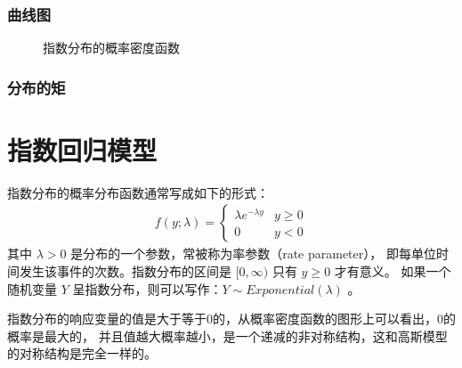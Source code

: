 \documentclass[letterpaper,10pt,english]{sphinxmanual}
\begin{document}
\subsubsection{曲线图}
\label{\detokenize{_u6307_u6570_u6a21_u578b/content:id4}}
\begin{figure}[htbp]
\centering
\capstart

\noindent{}
\caption{指数分布的概率密度函数}\label{\detokenize{_u6307_u6570_u6a21_u578b/content:id10}}\label{\detokenize{_u6307_u6570_u6a21_u578b/content:exponential-distribution-pdf}}\end{figure}


\subsubsection{分布的矩}
\label{\detokenize{_u6307_u6570_u6a21_u578b/content:id5}}

\section{指数回归模型}
\label{\detokenize{_u6307_u6570_u6a21_u578b/content:id6}}
指数分布的概率分布函数通常写成如下的形式：
\begin{equation}\label{equation:指数模型/content:指数模型/content:4}
\begin{split}f(y;\lambda)=
\begin{cases}
\lambda e^{-\lambda y} & y \ge 0 \\
0 & y<0
\end{cases}\end{split}
\end{equation}
其中 \(\lambda >0\) 是分布的一个参数，常被称为率参数（rate parameter），
即每单位时间发生该事件的次数。指数分布的区间是 \([0,\infty)\)
只有 \(y \ge 0\) 才有意义。
如果一个随机变量 \(Y\) 呈指数分布，则可以写作：\(Y \sim Exponential(\lambda)\)
。

指数分布的响应变量的值是大于等于0的，从概率密度函数的图形上可以看出，0的概率是最大的，
并且值越大概率越小，是一个递减的非对称结构，这和高斯模型的对称结构是完全一样的。
\end{document}
